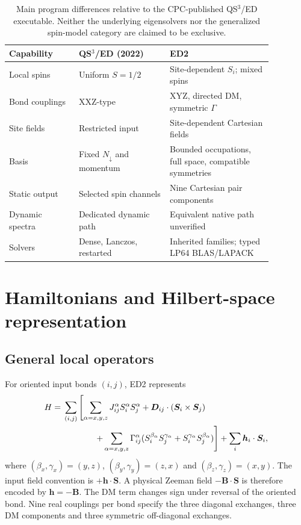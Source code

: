\documentclass[preprint,12pt,nopreprintline]{elsarticle}
\begin{document}
\begin{table}[t]
\centering
\caption{Main program differences relative to the CPC-published
QS$^3$/ED executable. Neither the underlying eigensolvers nor
the generalized spin-model category are claimed to be exclusive.}
\label{tab:program-scope}
\small
\begin{tabular}{p{0.23\linewidth}p{0.30\linewidth}p{0.34\linewidth}}
\toprule
Capability & QS$^3$/ED (2022) & ED2 \\
\midrule
Local spins & Uniform $S=1/2$ & Site-dependent $S_i$; mixed spins \\
Bond couplings & XXZ-type & XYZ, directed DM, symmetric $\Gamma$ \\
Site fields & Restricted input & Site-dependent Cartesian fields \\
Basis & Fixed $N_\downarrow$ and momentum & Bounded occupations, full space, compatible symmetries \\
Static output & Selected spin channels & Nine Cartesian pair components \\
Dynamic spectra & Dedicated dynamic path & Equivalent native path unverified \\
Solvers & Dense, Lanczos, restarted & Inherited families; typed LP64 BLAS/LAPACK \\
\bottomrule
\end{tabular}
\end{table}

\section{Hamiltonians and Hilbert-space representation}
\subsection{General local operators}
For oriented input bonds $(i,j)$, ED2 represents
\begin{align}
H={}&\sum_{(i,j)}\left[
\sum_{\alpha=x,y,z}J^\alpha_{ij}S_i^\alpha S_j^\alpha
+\bm D_{ij}\cdot(\bm S_i\times\bm S_j)\right.\nonumber\\
&\left.\hspace{13mm}+
\sum_{\alpha=x,y,z}\Gamma^\alpha_{ij}
(S_i^{\beta_\alpha}S_j^{\gamma_\alpha}
 +S_i^{\gamma_\alpha}S_j^{\beta_\alpha})\right]
+\sum_i\bm h_i\cdot\bm S_i ,
\label{eq:general}
\end{align}
where $(\beta_x,\gamma_x)=(y,z)$,
$(\beta_y,\gamma_y)=(z,x)$ and
$(\beta_z,\gamma_z)=(x,y)$.
The input field convention is $+\bm h\cdot\bm S$.
A physical Zeeman field $-\bm B\cdot\bm S$ is therefore
encoded by $\bm h=-\bm B$.
The DM term changes sign under reversal of the oriented bond.
Nine real couplings per bond specify the three diagonal exchanges,
three DM components and three symmetric off-diagonal exchanges.
\end{document}
